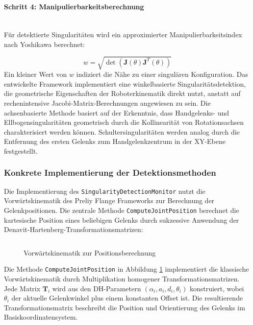 \paragraph{Schritt 4: Manipulierbarkeitsberechnung}~\\
Für detektierte Singularitäten wird ein approximierter Manipulierbarkeitsindex
nach Yoshikawa berechnet:

\begin{equation}
	w = \sqrt{\det(\mathbf{J}(\theta)\mathbf{J}^T(\theta))}
	\label{eq:manipulability}
\end{equation}
\noindent
Ein kleiner Wert von $w$ indiziert die Nähe zu einer singulären Konfiguration.
Das entwickelte Framework implementiert eine winkelbasierte
Singularitätsdetektion, die geometrische Eigenschaften der Roboterkinematik
direkt nutzt, anstatt auf rechenintensive Jacobi-Matrix-Berechnungen angewiesen
zu sein. Die achsenbasierte Methode basiert auf der Erkenntnis, dass
Handgelenks- und Ellbogensingularitäten geometrisch durch die Kollinearität von Rotationsachsen
charakterisiert werden können. Schultersingularitäten werden analog durch die
Entfernung des ersten Gelenks zum Handgelenkzentrum in der XY-Ebene festgestellt.

\subsubsection{Konkrete Implementierung der Detektionsmethoden}
\label{sssec:Implementierung_Detektionsmethoden}
Die Implementierung des \texttt{SingularityDetectionMonitor} nutzt die
Vorwärtskinematik des Preliy Flange Frameworks zur Berechnung der
Gelenkpositionen. Die zentrale Methode \texttt{ComputeJointPosition} berechnet
die kartesische Position eines beliebigen Gelenks durch sukzessive Anwendung
der Denavit-Hartenberg-Transformationsmatrizen:

\begin{figure}[H]
	\inputminted[fontsize=\footnotesize]{csharp}{code-snippets/CalculateJointPos.cs}
	\caption{Vorwärtskinematik zur Positionsberechnung}
	\label{listing:forwardKinematic}
\end{figure}

\noindent
Die Methode \texttt{ComputeJointPosition} in Abbildung \ref{listing:forwardKinematic} implementiert die klassische Vorwärtskinematik durch
Multiplikation homogener Transformationsmatrizen. Jede Matrix $\mathbf{T}_i$
wird aus den DH-Parametern $(\alpha_i, a_i, d_i, \theta_i)$ konstruiert, wobei
$\theta_i$ der aktuelle Gelenkwinkel plus einem konstanten Offset ist. Die
resultierende Transformationsmatrix beschreibt die Position und Orientierung des
Gelenks im Basiskoordinatensystem.\\

